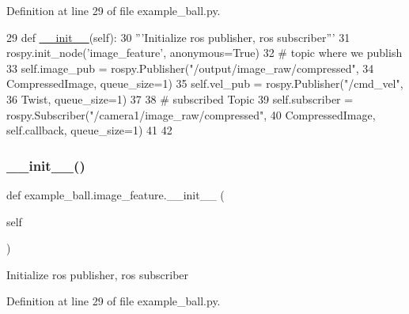 Definition at line 29 of file example\+\_\+ball.\+py.


\begin{DoxyCode}
29     \textcolor{keyword}{def }\hyperlink{classstate__machine_1_1Play_a5993a23d8be7f7b2647f71ede0334957}{\_\_init\_\_}(self):
30         \textcolor{stringliteral}{'''Initialize ros publisher, ros subscriber'''}
31         rospy.init\_node(\textcolor{stringliteral}{'image\_feature'}, anonymous=\textcolor{keyword}{True})
32      \textcolor{comment}{# topic where we publish}
33         self.image\_pub = rospy.Publisher(\textcolor{stringliteral}{"/output/image\_raw/compressed"},
34                                          CompressedImage, queue\_size=1)
35         self.vel\_pub = rospy.Publisher(\textcolor{stringliteral}{"/cmd\_vel"},
36                                        Twist, queue\_size=1)
37 
38         \textcolor{comment}{# subscribed Topic}
39         self.subscriber = rospy.Subscriber(\textcolor{stringliteral}{"/camera1/image\_raw/compressed"},
40                                            CompressedImage, self.callback,  queue\_size=1)
41 
42 
\end{DoxyCode}
\mbox{\label{classexample__ball_1_1image__feature_a763c2126c33347904853ec4193273b8e}} 
\subsubsection{\texorpdfstring{\+\_\+\+\_\+init\+\_\+\+\_\+()}{\_\_init\_\_()}\hspace{0.1cm}{\footnotesize\ttfamily [3/3]}}
{\footnotesize\ttfamily def example\+\_\+ball.\+image\+\_\+feature.\+\_\+\+\_\+init\+\_\+\+\_\+ (\begin{DoxyParamCaption}\item[{}]{self }\end{DoxyParamCaption})}

\begin{DoxyVerb}Initialize ros publisher, ros subscriber\end{DoxyVerb}
 

Definition at line 29 of file example\+\_\+ball.\+py.


